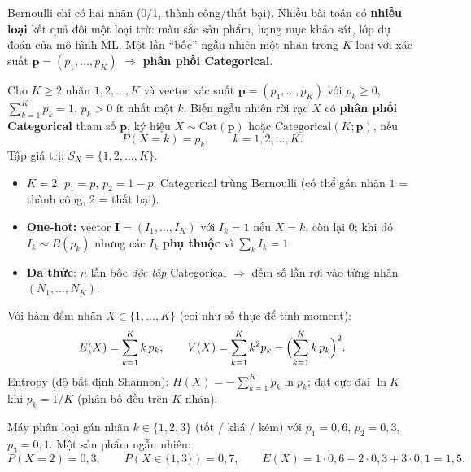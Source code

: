 \documentclass[12pt,a4paper]{article}
\begin{document}
\begin{dongco}[title={Động cơ - Nhiều hơn hai kết cục}]
Bernoulli chỉ có hai nhãn ($0/1$, thành công/thất bại). Nhiều bài toán có \textbf{nhiều loại} kết quả đôi một loại trừ: màu sắc sản phẩm, hạng mục khảo sát, lớp dự đoán của mô hình ML. Một lần ``bốc'' ngẫu nhiên một nhãn trong $K$ loại với xác suất $\mathbf{p} = (p_1,\ldots,p_K)$ $\Rightarrow$ \textbf{phân phối Categorical}.
\end{dongco}

\begin{dinhnghia}[title={Phân phối Categorical}]
  Cho $K \ge 2$ nhãn $1, 2, \ldots, K$ và vector xác suất $\mathbf{p} = (p_1, \ldots, p_K)$ với $p_k \ge 0$, $\displaystyle\sum_{k=1}^{K} p_k = 1$, $p_k > 0$ ít nhất một $k$.
  Biến ngẫu nhiên rời rạc $X$ có \textbf{phân phối Categorical} tham số $\mathbf{p}$, ký hiệu $X \sim \mathrm{Cat}(\mathbf{p})$ hoặc $\mathrm{Categorical}(K; \mathbf{p})$, nếu
  \[
    P(X = k) = p_k, \qquad k = 1, 2, \ldots, K.
  \]
  Tập giá trị: $S_X = \{1, 2, \ldots, K\}$.
\end{dinhnghia}

\begin{luuy}[title={Categorical và Bernoulli}]
  \begin{itemize}
    \item $K = 2$, $p_1 = p$, $p_2 = 1-p$: Categorical trùng Bernoulli (có thể gán nhãn $1$ = thành công, $2$ = thất bại).
    \item \textbf{One-hot:} vector $\mathbf{I} = (I_1,\ldots,I_K)$ với $I_k = 1$ nếu $X = k$, còn lại $0$; khi đó $I_k \sim B(p_k)$ nhưng các $I_k$ \textbf{phụ thuộc} vì $\sum_k I_k = 1$.
    \item \textbf{Đa thức}: $n$ lần bốc \emph{độc lập} Categorical $\Rightarrow$ đếm số lần rơi vào từng nhãn $(N_1,\ldots,N_K)$.
  \end{itemize}
\end{luuy}

\begin{dinhly}[title={Kỳ vọng và phương sai}]
  Với hàm đếm nhãn $X \in \{1,\ldots,K\}$ (coi như số thực để tính moment):
  \[
    E(X) = \sum_{k=1}^{K} k\, p_k, \qquad
    V(X) = \sum_{k=1}^{K} k^2 p_k - \Bigl(\sum_{k=1}^{K} k\, p_k\Bigr)^2.
  \]
  Entropy (độ bất định Shannon): $H(X) = -\displaystyle\sum_{k=1}^{K} p_k \ln p_k$; đạt cực đại $\ln K$ khi $p_k = 1/K$ (phân bố đều trên $K$ nhãn).
\end{dinhly}

\begin{vidu}[title={Phân loại sản phẩm}]
Máy phân loại gán nhãn $k \in \{1,2,3\}$ (tốt / khá / kém) với $p_1 = 0{,}6$, $p_2 = 0{,}3$, $p_3 = 0{,}1$. Một sản phẩm ngẫu nhiên:
\[
  P(X = 2) = 0{,}3, \qquad P(X \in \{1,3\}) = 0{,}7, \qquad E(X) = 1 \cdot 0{,}6 + 2 \cdot 0{,}3 + 3 \cdot 0{,}1 = 1{,}5.
\]
\end{vidu}
\end{document}
